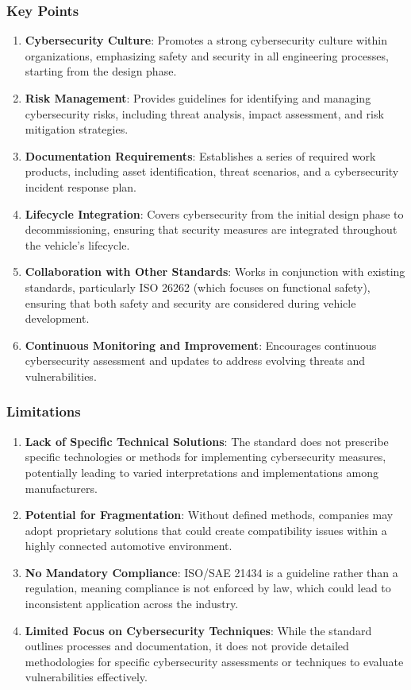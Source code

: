 \subsubsection{Key Points}\label{subsubsec:key-points-1}
\begin{enumerate}
    \item \textbf{Cybersecurity Culture}: Promotes a strong cybersecurity culture within organizations, emphasizing safety and security in all engineering processes, starting from the design phase.
    \item \textbf{Risk Management}: Provides guidelines for identifying and managing cybersecurity risks, including threat analysis, impact assessment, and risk mitigation strategies.
    \item \textbf{Documentation Requirements}: Establishes a series of required work products, including asset identification, threat scenarios, and a cybersecurity incident response plan.
    \item \textbf{Lifecycle Integration}: Covers cybersecurity from the initial design phase to decommissioning, ensuring that security measures are integrated throughout the vehicle's lifecycle.
    \item \textbf{Collaboration with Other Standards}: Works in conjunction with existing standards, particularly ISO 26262 (which focuses on functional safety), ensuring that both safety and security are considered during vehicle development.
    \item \textbf{Continuous Monitoring and Improvement}: Encourages continuous cybersecurity assessment and updates to address evolving threats and vulnerabilities.
\end{enumerate}

\subsubsection{Limitations}\label{subsubsec:limitations}
\begin{enumerate}
    \item \textbf{Lack of Specific Technical Solutions}: The standard does not prescribe specific technologies or methods for implementing cybersecurity measures, potentially leading to varied interpretations and implementations among manufacturers.
    \item \textbf{Potential for Fragmentation}: Without defined methods, companies may adopt proprietary solutions that could create compatibility issues within a highly connected automotive environment.
    \item \textbf{No Mandatory Compliance}: ISO/SAE 21434 is a guideline rather than a regulation, meaning compliance is not enforced by law, which could lead to inconsistent application across the industry.
    \item \textbf{Limited Focus on Cybersecurity Techniques}: While the standard outlines processes and documentation, it does not provide detailed methodologies for specific cybersecurity assessments or techniques to evaluate vulnerabilities effectively.
\end{enumerate}

